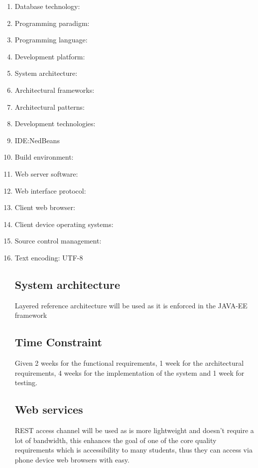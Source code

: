  
%

	\begin{enumerate}
		\item Database technology: 
		\item Programming paradigm: 
		\item Programming language: 
		\item Development platform:  
		\item System architecture: 
		\item Architectural frameworks: 
		\item Architectural patterns: 
		\item Development technologies:
		\item IDE:NedBeans
		\item Build environment:
		\item Web server software:
		\item Web interface protocol:
		\item Client web browser:
		\item Client device operating systems:
		\item Source control management: 
		\item Text encoding: UTF-8
		
		
			\subsection{System architecture}
				Layered reference architecture will be used as it is enforced in the JAVA-EE framework
				
			\subsection{Time Constraint }		
					Given 2 weeks for the functional requirements, 1 week for the architectural requirements, 4 weeks 							for the implementation of the system and 1 week for testing.	
					
		
			\subsection{Web services}		
				REST access channel will be used as is more lightweight and doesn’t require a lot of bandwidth, this 						enhances the goal of one of the core quality requirements which is accessibility to many students, 					thus they can access via phone device web browsers with easy.
				

\end{enumerate}
